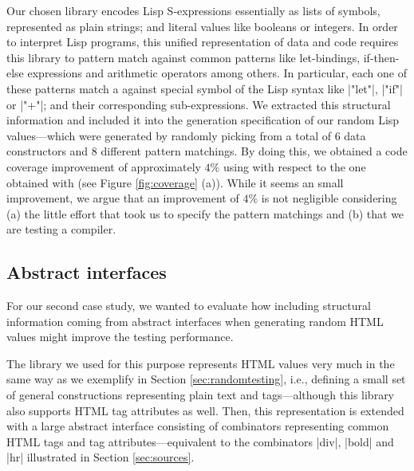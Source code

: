 Our chosen library encodes Lisp S-expressions essentially as lists of symbols,
represented as plain strings; and literal values like booleans or integers.
%
In order to interpret Lisp programs, this unified representation of data and
code requires this library to pattern match against common patterns like
let-bindings, if-then-else expressions and arithmetic operators among others.
%
In particular, each one of these patterns match a against special symbol of the
Lisp syntax like |"let"|, |"if"| or |"+"|; and their corresponding
sub-expressions.
%
We extracted this structural information and included it into the generation
specification of our random Lisp values---which were generated by randomly
picking from a total of 6 data constructors and 8 different pattern matchings.
%
By doing this, we obtained a code coverage improvement of approximately $4\%$
using \dragenp with respect to the one obtained with \dragen (see Figure
\ref{fig:coverage} (a)).
%
While it seems an small improvement, we argue that an improvement of $4\%$ is
not negligible considering (a) the little effort that took us to specify the pattern
matchings and (b) that we are testing a compiler.
%

\subsection{Abstract interfaces}


For our second case study, we wanted to evaluate how including structural
information coming from abstract interfaces when generating random HTML values
might improve the testing performance.


The library we used for this purpose represents HTML values very much in the
same way as we exemplify in Section \ref{sec:randomtesting}, i.e., defining a
small set of general constructions representing plain text and tags---although
this library also supports HTML tag attributes as well.
%
Then, this representation is extended with a large abstract interface consisting
of combinators representing common HTML tags and tag attributes---equivalent to
the combinators |div|, |bold| and |hr| illustrated in Section \ref{sec:sources}.


